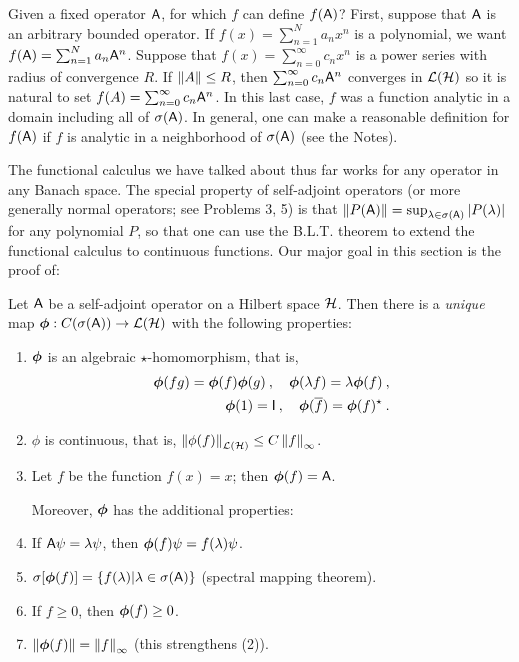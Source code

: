 Given a fixed operator $\mathsf{A}$, for which $f$ can define $f(\mathsf{A})$?
First, suppose that $\mathsf{A}$ is an arbitrary bounded operator. If $f(x) = \sum_{n=1}^N a_n x^n$ is a polynomial, we want $f(\mathsf{A}) = \sum_{n=1}^N a_n \mathsf{A}^n$. Suppose that $f(x) = \sum_{n=0}^\infty c_n x^n$ is a power series with radius of convergence $R$. If $\left \Vert A \right \Vert \leq R$, then $\sum_{n=0}^\infty c_n \mathsf{A}^n$ converges in $\mathcal{L}(\mathcal{H})$ so it is natural to set $f(A) = \sum_{n=0}^\infty c_n \mathsf{A}^n$. In this last case, $f$ was a function analytic in a domain including all of $\sigma(\mathsf{A})$. In general, one can make a reasonable definition for $f(\mathsf{A})$ if $f$ is analytic in a neighborhood of $\sigma(\mathsf{A})$ (see the Notes).

The functional calculus we have talked about thus far works for any operator in any Banach space. The special property of self-adjoint operators (or more generally normal operators; see Problems 3, 5) is that $\left \Vert P(\mathsf{A}) \right \Vert = \sup_{\lambda \in \sigma (\mathsf{A})} |P(\lambda)|$ for any polynomial $P$, so that one can use the B.L.T. theorem to extend the functional calculus to continuous functions. Our major goal in this section is the proof of:

\begin{theorem} \label{Theorem VII.1}
    Let $\mathsf{A}$ be a self-adjoint operator on a Hilbert space $\mathcal{H}$. Then there is a \textit{unique} map $\boldsymbol{\phi}: C(\sigma(\mathsf{A})) \to \mathcal{L}(\mathcal{H})$ with the following properties:
    \begin{enumerate}
        \item $\boldsymbol{\phi}$ is an algebraic $\star$-homomorphism, that is,
        \begin{align}
            \boldsymbol{\phi}(fg) = \boldsymbol{\phi}(f) \boldsymbol{\phi}(g) \:, \quad \boldsymbol{\phi}(\lambda f) = \lambda \boldsymbol{\phi}(f) \:, \\
            \boldsymbol{\phi}(1) = \mathsf{I} \:, \quad \boldsymbol{\phi}(\overline{f}) = \boldsymbol{\phi}(f)^\star \:. 
        \end{align}
        \item $\phi$ is continuous, that is, $\left \Vert \phi(f) \right \Vert_{\mathcal{L}(\mathcal{H})} \leq C \left \Vert f \right \Vert_{\infty}$.
        \item Let $f$ be the function $f(x) = x$; then $\boldsymbol{\phi}(f) = \mathsf{A}$.
        
        Moreover, $\boldsymbol{\phi}$ has the additional properties:

        \item If $\mathsf{A} \psi = \lambda \psi$, then $\boldsymbol{\phi}(f) \psi = f(\lambda) \psi$.
        \item $\sigma[\boldsymbol{\phi}(f)] = \left \lbrace f(\lambda) | \lambda \in \sigma(\mathsf{A}) \right \rbrace$ (spectral mapping theorem).
        \item If $f \geq 0$, then $\boldsymbol{\phi}(f) \geq 0$.
        \item $\left \Vert \boldsymbol{\phi}(f) \right \Vert = \left \Vert f \right \Vert_{\infty}$ (this strengthens (2)). 
    \end{enumerate}
\end{theorem}

